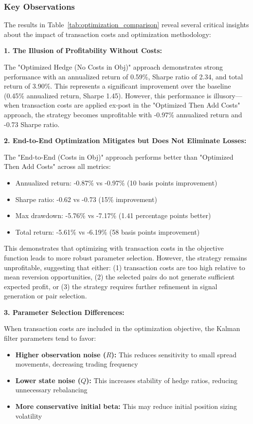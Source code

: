 \subsubsection{Key Observations}

The results in Table~\ref{tab:optimization_comparison} reveal several critical insights about the impact of transaction costs and optimization methodology:

\textbf{1. The Illusion of Profitability Without Costs:}

The "Optimized Hedge (No Costs in Obj)" approach demonstrates strong performance with an annualized return of 0.59\%, Sharpe ratio of 2.34, and total return of 3.90\%. This represents a significant improvement over the baseline (0.45\% annualized return, Sharpe 1.45). However, this performance is illusory—when transaction costs are applied ex-post in the "Optimized Then Add Costs" approach, the strategy becomes unprofitable with -0.97\% annualized return and -0.73 Sharpe ratio.

\textbf{2. End-to-End Optimization Mitigates but Does Not Eliminate Losses:}

The "End-to-End (Costs in Obj)" approach performs better than "Optimized Then Add Costs" across all metrics:
\begin{itemize}
    \item Annualized return: -0.87\% vs -0.97\% (10 basis points improvement)
    \item Sharpe ratio: -0.62 vs -0.73 (15\% improvement)
    \item Max drawdown: -5.76\% vs -7.17\% (1.41 percentage points better)
    \item Total return: -5.61\% vs -6.19\% (58 basis points improvement)
\end{itemize}

This demonstrates that optimizing with transaction costs in the objective function leads to more robust parameter selection. However, the strategy remains unprofitable, suggesting that either: (1) transaction costs are too high relative to mean reversion opportunities, (2) the selected pairs do not generate sufficient expected profit, or (3) the strategy requires further refinement in signal generation or pair selection.

\textbf{3. Parameter Selection Differences:}

When transaction costs are included in the optimization objective, the Kalman filter parameters tend to favor:
\begin{itemize}
    \item \textbf{Higher observation noise ($R$):} This reduces sensitivity to small spread movements, decreasing trading frequency
    \item \textbf{Lower state noise ($Q$):} This increases stability of hedge ratios, reducing unnecessary rebalancing
    \item \textbf{More conservative initial beta:} This may reduce initial position sizing volatility
\end{itemize}

